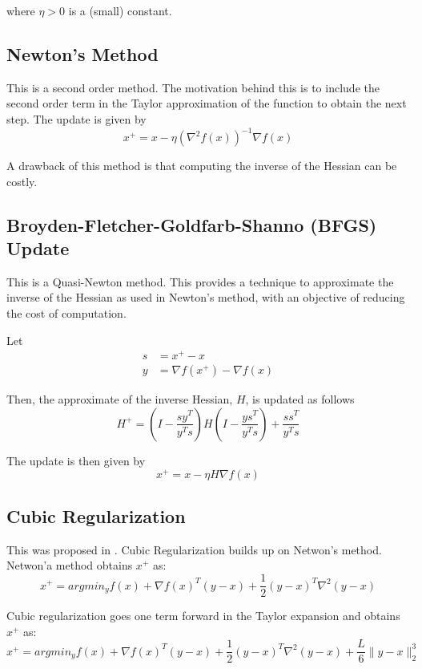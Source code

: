 \documentclass{article}
\begin{document}
where $\eta > 0$ is a (small) constant.

\subsection{Newton's Method}
This is a second order method. The motivation behind this is to include the second order term in the Taylor approximation of the function to obtain the next step. The update is given by
\begin{equation}
x^+ = x - \eta \left(\nabla^2 f(x) \right)^{-1}\nabla f(x)
\end{equation}

A drawback of this method is that computing the inverse of the Hessian can be costly.

\subsection{Broyden-Fletcher-Goldfarb-Shanno (BFGS) Update}
This is a Quasi-Newton method. This provides a technique to approximate the inverse of the Hessian as used in Newton's method, with an objective of reducing the cost of computation.

Let
\begin{align}
s &= x^+ - x \\
y &= \nabla f(x^+) - \nabla f(x)
\end{align}

Then, the approximate of the inverse Hessian, $H$, is updated as follows
\begin{equation}
H^+ = \left(I - \frac{sy^T}{y^Ts}\right)H\left(I-\frac{ys^T}{y^Ts}\right)+\frac{ss^T}{y^Ts}
\end{equation}

The update is then given by
\begin{equation}
x^+ = x - \eta H \nabla f(x)
\end{equation}

\subsection{Cubic Regularization}
This was proposed in \citep{nesterov2006cubic}. Cubic Regularization builds up on Netwon's method. Netwon'a method obtains $x^+$ as:
\begin{equation}
	x^+ = argmin_y f(x) + \nabla f(x)^T (y-x) + \frac12 (y-x)^T \nabla^2 (y-x)
\end{equation}

Cubic regularization goes one term forward in the Taylor expansion and obtains $x^+$ as:
\begin{equation}
x^+ = argmin_y f(x) + \nabla f(x)^T (y-x) + \frac12 (y-x)^T \nabla^2 (y-x) + \frac{L}{6}\lVert y-x \rVert_2^3
\end{equation}
\end{document}
